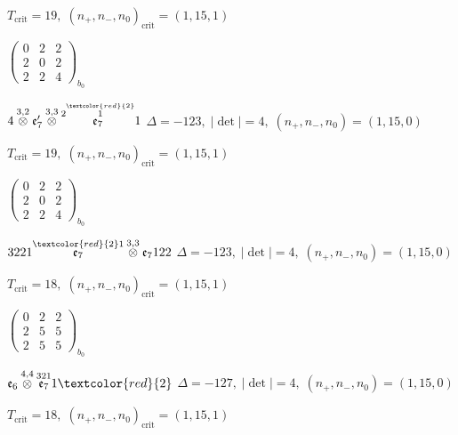 \documentclass[10pt]{article}
\begin{document}
\hspace{1em}$T_{\text{crit}}=19,\; (n_+,n_-,n_0)_{\text{crit}}=(1,15,1)$

\hspace{2em}$\left(\begin{smallmatrix}0 & 2 & 2 \\ 2 & 0 & 2 \\ 2 & 2 & 4\end{smallmatrix}\right)_{\!b_0}$

\smallskip

$4\overset{3,2}{\otimes}\mathfrak{e}_7'\overset{3,3}{\otimes}\overset{2\overset{\textcolor{red}{2}}{1}}{\mathfrak{e}_7}1$ \quad $\Delta=-123,\; |\det|=4,\; (n_+,n_-,n_0)=(1,15,0)$

\hspace{1em}$T_{\text{crit}}=19,\; (n_+,n_-,n_0)_{\text{crit}}=(1,15,1)$

\hspace{2em}$\left(\begin{smallmatrix}0 & 2 & 2 \\ 2 & 0 & 2 \\ 2 & 2 & 4\end{smallmatrix}\right)_{\!b_0}$

\smallskip

$3221\overset{\textcolor{red}{2}1}{\mathfrak{e}_7}\overset{3,3}{\otimes}\mathfrak{e}_7122$ \quad $\Delta=-123,\; |\det|=4,\; (n_+,n_-,n_0)=(1,15,0)$

\hspace{1em}$T_{\text{crit}}=18,\; (n_+,n_-,n_0)_{\text{crit}}=(1,15,1)$

\hspace{2em}$\left(\begin{smallmatrix}0 & 2 & 2 \\ 2 & 5 & 5 \\ 2 & 5 & 5\end{smallmatrix}\right)_{\!b_0}$

\smallskip

$\mathfrak{e}_6\overset{4,4}{\otimes}\overset{321}{\mathfrak{e}_7}1\textcolor{red}{2}$ \quad $\Delta=-127,\; |\det|=4,\; (n_+,n_-,n_0)=(1,15,0)$

\hspace{1em}$T_{\text{crit}}=18,\; (n_+,n_-,n_0)_{\text{crit}}=(1,15,1)$
\end{document}
